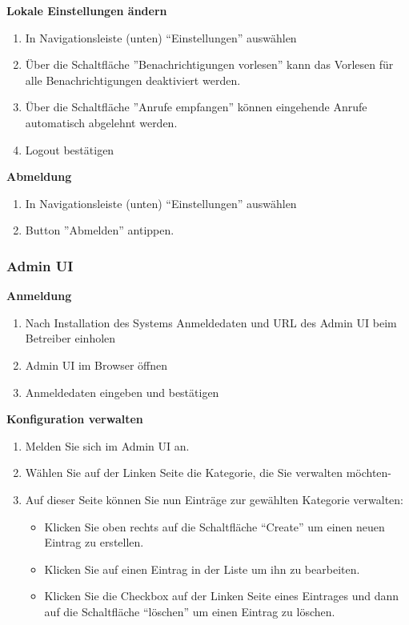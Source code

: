 \textbf{Lokale Einstellungen ändern}
\begin{enumerate}
    \item In Navigationsleiste (unten) ``Einstellungen'' auswählen
    \item Über die Schaltfläche ''Benachrichtigungen vorlesen'' kann das Vorlesen für alle Benachrichtigungen deaktiviert werden.
    \item Über die Schaltfläche ''Anrufe empfangen'' können eingehende Anrufe automatisch abgelehnt werden.
    \item Logout bestätigen
\end{enumerate}

\textbf{Abmeldung}

\begin{enumerate}
    \item In Navigationsleiste (unten) ``Einstellungen'' auswählen
    \item Button ''Abmelden'' antippen.
\end{enumerate}

\subsubsection*{Admin UI}

\textbf{Anmeldung}

\begin{enumerate}
    \item Nach Installation des Systems Anmeldedaten und URL des Admin UI beim Betreiber einholen
    \item Admin UI im Browser öffnen
    \item Anmeldedaten eingeben und bestätigen
\end{enumerate}

\textbf{Konfiguration verwalten}
\begin{enumerate}
    \item Melden Sie sich im Admin UI an.
    \item Wählen Sie auf der Linken Seite die Kategorie, die Sie verwalten möchten-
    \item Auf dieser Seite können Sie nun Einträge zur gewählten Kategorie verwalten:
    \begin{itemize}
        \item Klicken Sie oben rechts auf die Schaltfläche ``Create'' um einen neuen Eintrag zu erstellen.
        \item Klicken Sie auf einen Eintrag in der Liste um ihn zu bearbeiten.
        \item Klicken Sie die Checkbox auf der Linken Seite eines Eintrages und dann auf die Schaltfläche ``löschen'' um einen Eintrag zu löschen.
    \end{itemize}
\end{enumerate}

